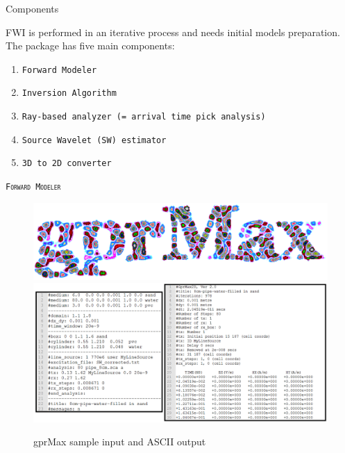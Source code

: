 \documentclass[final]{beamer}
\newlength{\onecolwid}
\begin{document}
\begin{frame}[t]
\begin{columns}[t]
\begin{column}{\onecolwid}
\begin{alertblock}{Components}
	
FWI is performed in an iterative process and needs initial models preparation. The package has five main components:
	\begin{enumerate}
		\item \hspace{1cm} \texttt{Forward Modeler}
		\item \hspace{1cm} \texttt{Inversion Algorithm}
		\item \hspace{1cm} \texttt{Ray-based analyzer (= arrival time pick analysis)}
		\item \hspace{1cm} \texttt{Source Wavelet (SW) estimator}
		\item \hspace{1cm} \texttt{3D to 2D converter} 
	\end{enumerate}
	
\end{alertblock}


\begin{block}{\textsc{\texttt{Forward Modeler}}}
	
\begin{figure}
	\includegraphics[width=0.7\linewidth]{gprmax.png}
	\vspace{1cm}
	\includegraphics[width=1\linewidth]{gprmax_image.png}
	\caption{gprMax sample input and ASCII output \cite{gprmax}}
\end{figure}
	

\end{block}
\end{column}
\end{columns}
\end{frame}
\end{document}
